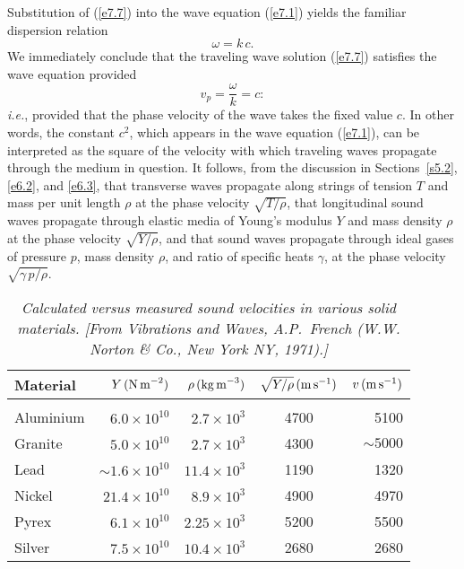 Substitution of (\ref{e7.7}) into the wave equation (\ref{e7.1}) yields the familiar dispersion relation
\begin{equation}\label{e7.11}
\omega = k\,c.
\end{equation}
We immediately conclude that the traveling wave solution (\ref{e7.7}) satisfies the wave equation
provided 
\begin{equation}
v_p = \frac{\omega}{k} = c:
\end{equation}
{\em i.e.}, provided that the phase velocity of the wave takes the fixed value $c$. 
In other words, the constant $c^2$, which appears in the wave
equation (\ref{e7.1}),  can be interpreted as the square of the velocity with which traveling waves propagate through the
medium in question. It follows, from the discussion in Sections~\ref{s5.2}, \ref{e6.2}, and \ref{e6.3}, that transverse waves propagate along strings of tension $T$ and
mass per unit length $\rho$ at the phase velocity $\sqrt{T/\rho}$, that longitudinal sound
waves propagate through elastic media of Young's modulus $Y$ and mass density
$\rho$ at the phase velocity $\sqrt{Y/\rho}$, and that sound waves propagate
through ideal gases of pressure $p$,  mass density $\rho$, and ratio of specific heats $\gamma$, at the phase velocity $\sqrt{\gamma\,p/\rho}$. 

\begin{table}
\centering
\begin{tabular}{lrrcr}
Material & $Y \,({\rm N\,m}^{-2})$ & $\rho \,({\rm kg\,m}^{-3})$ & $\sqrt{Y/\rho}\, ({\rm m\,s}^{-1})$ & $v\,({\rm m\,s}^{-1})$\\\hline &&&&\\[-1.75ex]
Aluminium & $6.0\times 10^{10}$ & $2.7\times 10^3$ & 4700 & 5100\\[0.5ex]
Granite & $5.0\times 10^{10}$ & $2.7\times 10^3$ & 4300 & $\sim 5000$\\[0.5ex]
Lead & $\sim 1.6\times 10^{10}$ & $11.4\times 10^3$ & 1190 & 1320\\[0.5ex]
Nickel & $21.4\times 10^{10}$ & $8.9\times 10^3$ & 4900 & 4970\\[0.5ex]
Pyrex & $6.1\times 10^{10}$ & $2.25\times 10^3$ & 5200 & 5500\\[0.5ex]
Silver & $7.5\times 10^{10}$ & $10.4\times 10^3$ & 2680 & 2680\\[0.5ex]
\end{tabular}
\caption{\em Calculated versus measured sound velocities in various solid materials. [From {\em Vibrations and Waves}, A.P.~French (W.W. Norton \& Co., New York NY, 1971).]}\label{t7.1}
\end{table}

